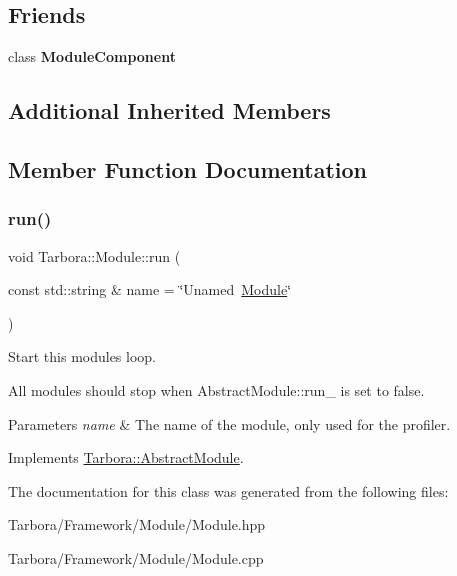 \subsection*{Friends}
\begin{DoxyCompactItemize}
\item 
\mbox{\label{classTarbora_1_1Module_aa5257bba6d1feaf686824c5ed461c990}} 
class {\bfseries Module\+Component}
\end{DoxyCompactItemize}
\subsection*{Additional Inherited Members}


\subsection{Member Function Documentation}
\mbox{\label{classTarbora_1_1Module_a8c0352045b21b985d3798caa3190c70b}} 
\subsubsection{\texorpdfstring{run()}{run()}}
{\footnotesize\ttfamily void Tarbora\+::\+Module\+::run (\begin{DoxyParamCaption}\item[{const std\+::string \&}]{name = {\ttfamily \char`\"{}Unamed~\hyperlink{classTarbora_1_1Module}{Module}\char`\"{}} }\end{DoxyParamCaption})\hspace{0.3cm}{\ttfamily [virtual]}}



Start this module\textquotesingle{}s loop. 

All modules should stop when Abstract\+Module\+::run\+\_\+ is set to false. 
\begin{DoxyParams}{Parameters}
{\em name} & The name of the module, only used for the profiler. \\
\hline
\end{DoxyParams}


Implements \hyperlink{classTarbora_1_1AbstractModule_acfb70b92b109b5e8ceae997c8629180a}{Tarbora\+::\+Abstract\+Module}.



The documentation for this class was generated from the following files\+:\begin{DoxyCompactItemize}
\item 
Tarbora/\+Framework/\+Module/Module.\+hpp\item 
Tarbora/\+Framework/\+Module/Module.\+cpp\end{DoxyCompactItemize}
